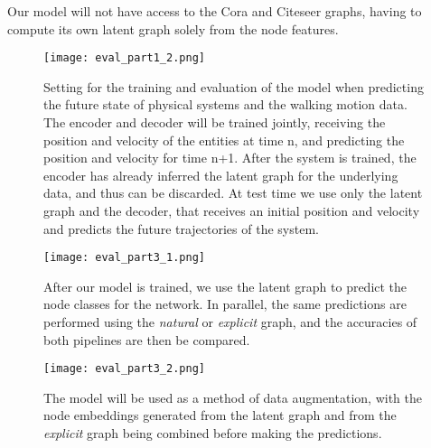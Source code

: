 \documentclass[12pt,a4paper]{article}
\begin{document}
	Our model will not have access to the Cora and Citeseer graphs, having to compute its own latent graph solely from the node features.
	
	\begin{figure}[hbtp]
		\texttt{[image: eval\_part1\_2.png]}
		\caption{Setting for the training and evaluation of the model when predicting the future state of physical systems and the walking motion data. The encoder and decoder will be trained jointly, receiving the position and velocity of the entities at time n, and predicting the position and velocity for time n+1. After the system is trained, the encoder has already inferred the latent graph for the underlying data, and thus can be discarded. At test time we use only the latent graph and the decoder, that receives an initial position and velocity and predicts the future trajectories of the system. \label{eval1}}
	\end{figure}
	
	\begin{figure}[hbtp]
		\centering \texttt{[image: eval\_part3\_1.png]}
		\caption{After our model is trained, we use the latent graph to predict the node classes for the network. In parallel, the same predictions are performed using the \emph{natural} or \emph{explicit} graph, and the accuracies of both pipelines are then be compared. \label{eval3_1}}
	\end{figure}
	
	\begin{figure}[hbtp]
		\centering \texttt{[image: eval\_part3\_2.png]}
		\caption{The model will be used as a method of data augmentation, with the node embeddings generated from the latent graph and from the \emph{explicit} graph being combined before making the predictions. \label{eval3_2}}
	\end{figure}
		
	\printbibliography
	
\end{document}
